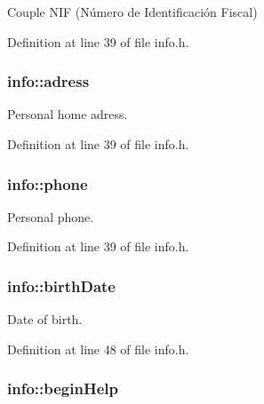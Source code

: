 Couple N\+I\+F (Número de Identificación Fiscal) 



Definition at line 39 of file info.\+h.

\hypertarget{classinfo_a589dff7ad548e9ac9a45f632539c9a0a}{
\subsubsection[{adress}]{\setlength{\rightskip}{0pt plus 5cm}info\+::adress\hspace{0.3cm}{\ttfamily [private]}}}\label{classinfo_a589dff7ad548e9ac9a45f632539c9a0a}


Personal home adress. 



Definition at line 39 of file info.\+h.

\hypertarget{classinfo_a716fe5520eb096be308dcd18f7cbd1c1}{
\subsubsection[{phone}]{\setlength{\rightskip}{0pt plus 5cm}info\+::phone\hspace{0.3cm}{\ttfamily [private]}}}\label{classinfo_a716fe5520eb096be308dcd18f7cbd1c1}


Personal phone. 



Definition at line 39 of file info.\+h.

\hypertarget{classinfo_a2269c62bc80419abee5ab99596715014}{
\subsubsection[{birth\+Date}]{\setlength{\rightskip}{0pt plus 5cm}info\+::birth\+Date\hspace{0.3cm}{\ttfamily [private]}}}\label{classinfo_a2269c62bc80419abee5ab99596715014}


Date of birth. 



Definition at line 48 of file info.\+h.

\hypertarget{classinfo_a860bf129937fda542024222bd425a224}{
\subsubsection[{begin\+Help}]{\setlength{\rightskip}{0pt plus 5cm}info\+::begin\+Help\hspace{0.3cm}{\ttfamily [private]}}}\label{classinfo_a860bf129937fda542024222bd425a224}


